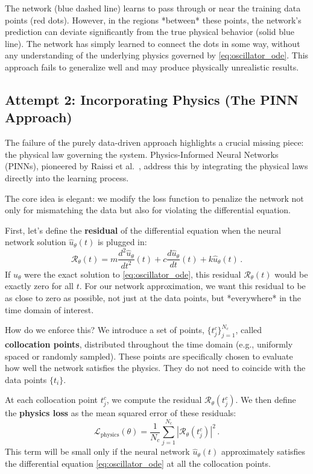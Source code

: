 The network (blue dashed line) learns to pass through or near the training data points (red dots). However, in the regions *between* these points, the network's prediction can deviate significantly from the true physical behavior (solid blue line). The network has simply learned to connect the dots in some way, without any understanding of the underlying physics governed by \cref{eq:oscillator_ode}. This approach fails to generalize well and may produce physically unrealistic results.

\subsection{Attempt 2: Incorporating Physics (The PINN Approach)}

The failure of the purely data-driven approach highlights a crucial missing piece: the physical law governing the system. Physics-Informed Neural Networks (PINNs), pioneered by Raissi et al.~\cite{raissi2019physics}, address this by integrating the physical laws directly into the learning process.

The core idea is elegant: we modify the loss function to penalize the network not only for mismatching the data but also for violating the differential equation.

First, let's define the \textbf{residual} of the differential equation when the neural network solution $\hat{u}_\theta(t)$ is plugged in:
%
\begin{equation}
\mathcal{R}_\theta(t) = m\frac{d^2\hat{u}_\theta}{dt^2}(t) + c\frac{d\hat{u}_\theta}{dt}(t) + k\hat{u}_\theta(t)\,.
\label{eq:residual_oscillator}
\end{equation}
%
If $\hat{u}_\theta$ were the exact solution to \cref{eq:oscillator_ode}, this residual $\mathcal{R}_\theta (t)$ would be exactly zero for all $t$. For our network approximation, we want this residual to be as close to zero as possible, not just at the data points, but *everywhere* in the time domain of interest.

How do we enforce this? We introduce a set of points, $\{t_j^c\}_{j=1}^{N_c}$, called \textbf{collocation points}, distributed throughout the time domain (e.g., uniformly spaced or randomly sampled). These points are specifically chosen to evaluate how well the network satisfies the physics. They do not need to coincide with the data points $\{t_i\}$.

At each collocation point $t_j^c$, we compute the residual $\mathcal{R}_\theta(t_j^c)$. We then define the \textbf{physics loss} as the mean squared error of these residuals:
%
\begin{equation}
\mathcal{L}_{\text{physics}}(\theta) = \frac{1}{N_c}\sum_{j=1}^{N_c}|\mathcal{R}_\theta(t_j^c)|^2\,.
\label{eq:loss_physics}
\end{equation}
%
This term will be small only if the neural network $\hat{u}_\theta(t)$ approximately satisfies the differential equation \eqref{eq:oscillator_ode} at all the collocation points.

